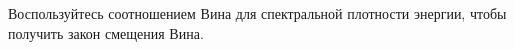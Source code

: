 \documentclass[__main__.tex]{subfiles}
\begin{document}
Воспользуйтесь соотношением Вина для спектральной плотности энергии, чтобы получить закон смещения Вина.\\ 

\end{document}
